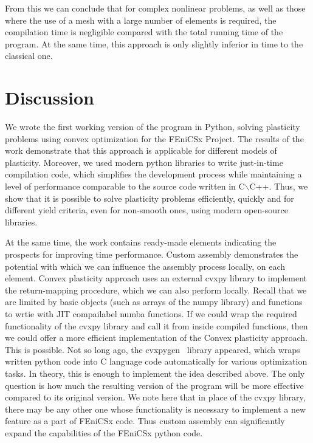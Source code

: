 \documentclass[12pt]{article}
\begin{document}
From this we can conclude that for complex nonlinear problems, as well as those where the use of a mesh with a large number of elements is required, the compilation time is negligible compared with the total running time of the program. At the same time, this approach is only slightly inferior in time to the classical one.

\newpage
\section{Discussion}

We wrote the first working version of the program in Python, solving plasticity problems using convex optimization for the FEniCSx Project. The results of the work demonstrate that this approach is applicable for different models of plasticity. Moreover, we used modern python libraries to write just-in-time compilation code, which simplifies the development process while maintaining a level of performance comparable to the source code written in C$\backslash$C++. Thus, we show that it is possible to solve plasticity problems efficiently, quickly and for different yield criteria, even for non-smooth ones, using modern open-source libraries. 

At the same time, the work contains ready-made elements indicating the prospects for improving time performance. Custom assembly demonstrates the potential with which we can influence the assembly process locally, on each element. Convex plasticity approach uses an external cvxpy library to implement the return-mapping procedure, which we can also perform locally. Recall that we are limited by basic objects (such as arrays of the numpy library) and functions to wrtie with JIT compailabel numba functions. If we could wrap the required functionality of the cvxpy library and call it from inside compiled functions, then we could offer a more efficient implementation of the Convex plasticity approach. This is possible. Not so long ago, the cvxpygen~\parencite{cvxpygen2022} library appeared, which wraps written python code into C language code automatically for various optimization tasks. In theory, this is enough to implement the idea described above. The only question is how much the resulting version of the program will be more effective compared to its original version. We note here that in place of the cvxpy library, there may be any other one whose functionality is necessary to implement a new feature as a part of FEniCSx code. Thus custom assembly can significantly expand the capabilities of the FEniCSx python code.
\end{document}
